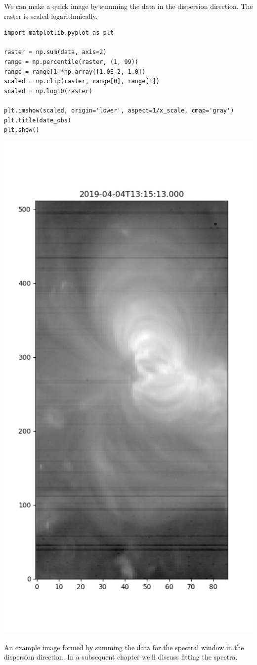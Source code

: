 We can make a quick image by summing the data in the dispersion direction. The
raster is scaled logarithmically.
\begin{lstlisting}
import matplotlib.pyplot as plt

raster = np.sum(data, axis=2)
range = np.percentile(raster, (1, 99))
range = range[1]*np.array([1.0E-2, 1.0])
scaled = np.clip(raster, range[0], range[1])
scaled = np.log10(raster)

plt.imshow(scaled, origin='lower', aspect=1/x_scale, cmap='gray')
plt.title(date_obs)
plt.show()
\end{lstlisting}
\begin{marginfigure}
  \centerline{\includegraphics[clip,width=\linewidth]{figures/test_imshow.pdf}}
  \caption{An example image formed by summing the data for the  spectral window in the
    dispersion direction. In a subsequent chapter we'll discuss fitting the spectra.}
  \label{fig:raster}
\end{marginfigure}

